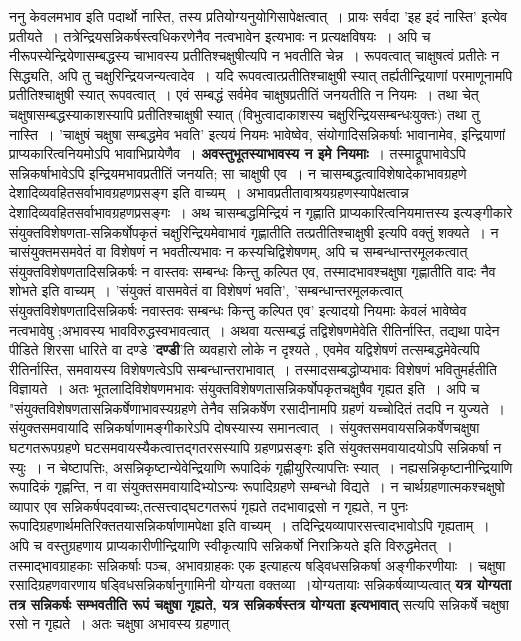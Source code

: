 {ननु केवलमभाव इति पदार्थो नास्ति, तस्य प्रतियोग्यनुयोगिसापेक्षत्वात्~। प्रायः सर्वदा 'इह इदं नास्ति' इत्येव प्रतीयते~। तत्रेन्द्रियसन्निकर्षस्त्वधिकरणेनैव नत्वभावेन इत्यभावः न प्रत्यक्षविषयः~। अपि च नीरूपस्येन्द्रियेणासम्बद्धस्य चाभावस्य प्रतीतिश्चक्षुषीत्यपि न भव\-तीति चेन्न~। रूपवत्वात् चाक्षुषत्वं प्रतीतेः न सिद्ध्यति, अपि तु चक्षुरिन्द्रियजन्यत्वादेव~। यदि रूपवत्वात्प्रतीतिश्चाक्षुषी स्यात् तर्ह्यतीन्द्रियाणां परमाणूनामपि प्रतीतिश्चाक्षुषी स्यात् रूपवत्वात्~। एवं सम्बद्धं सर्वमेव चाक्षुषप्रतीतिं जनयतीति न नियमः~। तथा चेत् चक्षुषा\break सम्बद्धस्याकाशस्यापि प्रतीतिश्चाक्षुषी स्यात् (विभुत्वादाकाशस्य चक्षुरिन्द्रियसम्बन्धः\break युक्तः) तथा तु नास्ति~। 'चाक्षुषं चक्षुषा सम्बद्धमेव भवति' इत्ययं नियमः भावेष्वेव, संयोगादि\-सन्निकर्षाः भावानामेव, इन्द्रियाणां प्राप्यकारित्वनियमोऽपि भावाभिप्रायेणैव~। \textbf{अवस्तुभूतस्याभावस्य न इमे नियमाः}~। तस्माद्रूपाभावेऽपि सन्निकर्षाभावेऽपि इन्द्रियमभावप्रतीतिं जनयति; सा चाक्षुषी एव~। न चासम्बद्धत्वाविशेषादेकाभावग्रहणे देशादिव्यवहितसर्वाभावग्रहणप्रसङ्‌ग इति वाच्यम्~। अभावप्रतीतावाश्रयग्रहणस्यापेक्षत्वान्न देशादिव्यवहितसर्वाभावग्रहणप्रसङ्गः~। अथ चासम्बद्धमिन्द्रियं न गृह्णाति प्राप्यकारित्वनियमात्तस्य इत्यङ्गीकारे संयुक्तविशेषणता-सन्निकर्षोपकृतं चक्षुरिन्द्रियमेवाभावं गृह्णातीति तत्प्रतीतिश्चाक्षुषी इत्यपि वक्तुं शक्यते~। न चासंयुक्तमसमवेतं वा विशेषणं न भवतीत्यभावः न कस्यचिद्विशेषणम्, अपि च सम्बन्धान्तरमूलकत्वात् संयुक्तविशेषणतादिसन्निकर्षः न वास्तवः सम्बन्धः \-किन्तु कल्पित एव, तस्मादभावश्चक्षुषा गृह्णातीति वादः नैव शोभते इति वाच्यम्~। 'संयुक्तं वा\break समवेतं वा विशेषणं भवति', 'सम्बन्धान्तरमूलकत्वात् संयुक्तविशेषणतादिसन्निकर्षः न\break वास्तवः सम्बन्धः किन्तु कल्पित एव' इत्यादयो नियमाः केवलं भावेष्वेव नत्वभावेषु ;\break अभावस्य भावविरुद्धस्वभावत्वात्~। अथवा यत्सम्बद्धं तद्विशेषणमेवेति रीतिर्नास्ति, तद्यथा \-पादेन पीडिते शिरसा धारिते वा दण्डे '\textbf{दण्डी}'ति व्यवहारो लोके न दृश्यते , एवमेव यद्विशेषणं तत्सम्बद्ध\-मेवेत्यपि रीतिर्नास्ति, समवायस्य विशेषणत्वेऽपि सम्बन्धान्तराभावात्~। तस्मादसम्बद्धोप्यभावः विशेषणं भवितुमर्हतीति विज्ञायते~। अतः भूतलादिविशेषणमभावः संयुक्तविशेषणतासन्निकर्षोपकृतचक्षुषैव गृह्यत इति~। अपि च "संयुक्तविशेषणतासन्निकर्षेणाभावस्य\break ग्रहणे तेनैव सन्निकर्षेण रसादीनामपि ग्रहणं यच्चोदितं तदपि न युज्यते~। संयुक्तसमवायादि सन्नि\-कर्षाणामङ्गीकारेऽपि दोषस्यास्य समानत्वात्~। संयुक्तसमवायसन्निकर्षेण\break चक्षुषा घटगतरूपग्रहणे घटसमवायस्यैकत्वात्तद्गतरसस्यापि ग्रहणप्रसङ्गः इति संयुक्तसमवाया\-दयोऽपि सन्निकर्षा न स्युः~। न चेष्टापत्तिः, असन्निकृष्टान्येवेन्द्रियाणि रूपादिकं गृह्णीयुरित्यापत्तिः स्यात्~। नह्यसन्निकृष्टानीन्द्रियाणि रूपादिकं गृह्णन्ति, न वा संयुक्तसमवायादिभ्योऽन्यः रूपादिग्रहणे सम्बन्धो विद्यते~। न चार्थग्रहणात्मकश्चक्षुषो व्यापार एव सन्निकर्षपदवाच्यः,\break तत्सत्त्वाद्घटगतरूपं गृह्यते तदभावाद्रसो न गृह्यते, न पुनः रूपादिग्रहणार्थमतिरिक्ततया\break सन्निकर्षाणामपेक्षा इति वाच्यम्~। तदिन्द्रियव्यापारसत्त्वादभावोऽपि गृह्यताम्~। अपि च वस्तु\-ग्रहणाय प्राप्यकारीणीन्द्रियाणि स्वीकृत्यापि सन्निकर्षो निराक्रियते इति विरुद्धमेतत्~।\break  तस्माद्भावग्राहकाः सन्निकर्षाः पञ्च, अभावग्राहकः एक इत्याहत्य षड्विधसन्निकर्षा अङ्गीकरणीयाः~। चक्षुषा रसादिग्रहणवारणाय षड्विधसन्निकर्षानुगामिनी योग्यता वक्तव्या~।\break योग्यतायाः सन्निकर्षव्याप्यत्वात् \textbf{यत्र योग्यता तत्र सन्निकर्षः सम्भवतीति रूपं चक्षुषा गृह्यते, यत्र सन्निकर्षस्तत्र योग्यता इत्यभावात्} सत्यपि सन्निकर्षे चक्षुषा रसो न गृह्यते~। अतः चक्षुषा अभावस्य ग्रहणात् }
